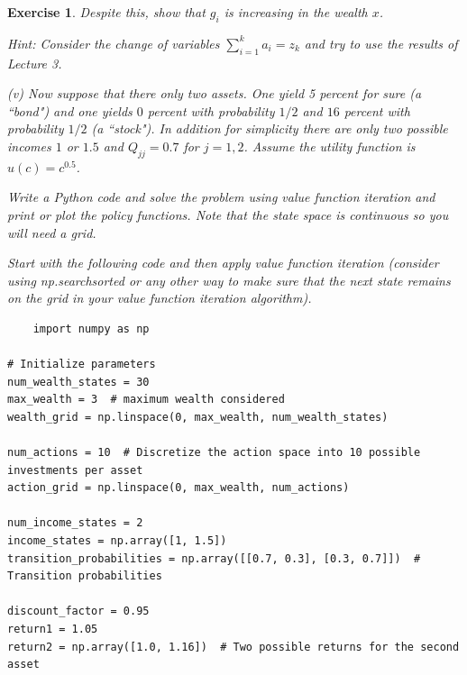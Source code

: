 \documentclass[letter,11pt]{article}
\newtheorem{exercise}{Exercise}[section]
\begin{document}
\begin{exercise}
 Despite this, show that $g_{i}$ is increasing in the wealth $x$.

   Hint: Consider the change of variables $\sum _{i=1}^{k} a_{i}  = z_{k}$ and try to use the results of Lecture 3.

   (v) Now suppose that there only two assets. One yield 5 percent for sure (a ``bond") and one yields $0$ percent with probability $1/2$ and $16$ percent with probability $1/2$ (a ``stock"). In addition for simplicity there are only two possible incomes $1$ or $1.5$ and $Q_{jj} = 0.7$ for $j=1,2$. Assume the utility function is $u(c) = c^{0.5}$. 

   Write a Python code and solve the problem using value function iteration and print or plot the policy functions. Note that the state space is continuous so you will need a grid. 

 Start with the following code and then apply value function iteration (consider using np.searchsorted or any other way to make sure that the next state remains on the grid in your value function iteration algorithm). 

\begin{verbatim}
    import numpy as np

# Initialize parameters
num_wealth_states = 30
max_wealth = 3  # maximum wealth considered
wealth_grid = np.linspace(0, max_wealth, num_wealth_states)

num_actions = 10  # Discretize the action space into 10 possible investments per asset
action_grid = np.linspace(0, max_wealth, num_actions)

num_income_states = 2
income_states = np.array([1, 1.5])
transition_probabilities = np.array([[0.7, 0.3], [0.3, 0.7]])  # Transition probabilities 

discount_factor = 0.95
return1 = 1.05
return2 = np.array([1.0, 1.16])  # Two possible returns for the second asset
\end{verbatim}

\end{exercise}
\end{document}
